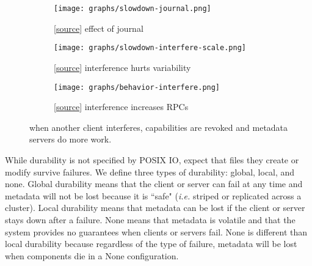 \begin{figure*}[t]
  \centering
  \begin{subfigure}[b]{.32\linewidth}
      \centering
      \texttt{[image: graphs/slowdown-journal.png]}
      \caption{[\href{https://github.com/michaelsevilla/cudele-popper/blob/master/experiments/baseline-durability/visualize/viz.ipynb}{source}]
      effect of journal} \label{fig:overhead-a}
  \end{subfigure}
  \begin{subfigure}[b]{.32\linewidth}
      \centering
      \texttt{[image: graphs/slowdown-interfere-scale.png]}
      \caption{[\href{https://github.com/michaelsevilla/cudele-popper/blob/master/experiments/baseline-creates/visualize/viz.ipynb}{source}]
      interference hurts variability}
      \label{fig:overhead-b}
  \end{subfigure}
  \begin{subfigure}[b]{.32\linewidth}
      \centering
      \texttt{[image: graphs/behavior-interfere.png]}
      \caption{[\href{https://github.com/michaelsevilla/cudele-popper/blob/master/experiments/baseline-interfere/visualize/viz.ipynb}{source}]
      interference increases RPCs}
      \label{fig:overhead-c}
  \end{subfigure}
  \caption{ when another client interferes, capabilities are revoked and
metadata servers do more work.} \label{fig:overhead}
\end{figure*}

While durability is not specified by POSIX IO,
 expect that files they create or
modify survive failures.  We define three types of durability: global, local,
and none.  Global durability means that the client or server can fail at any
time and metadata will not be lost because it is ``safe" ({\it i.e.} striped or
replicated across a cluster). Local durability means that metadata can be lost
if the client or server stays down after a failure. None means that metadata is
volatile and that the system provides no guarantees when clients or servers
fail.  None is different than local durability because regardless of the type
of failure, metadata will be lost when components die in a None configuration.

